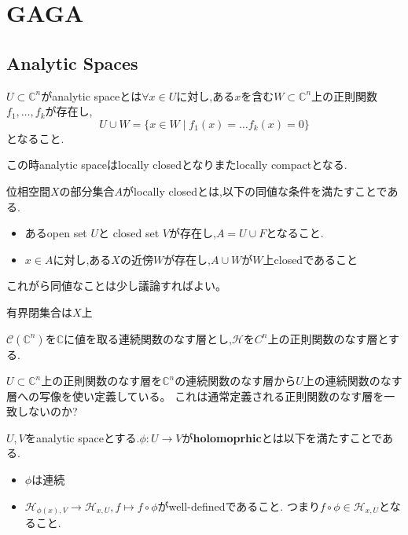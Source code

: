 \chapter{GAGA}
\section{Analytic Spaces}

\begin{screen}
\begin{dfn}
$U \subset \mathbb{C}^n$がanalytic spaceとは$\forall x \in U$に対し,ある$x$を含む$W \subset \mathbb{C}^n$上の正則関数$f_1, \ldots ,f_k$が存在し,
\begin{equation*}
  U \cup W = \{x \in W \mid f_1(x) = \ldots  f_k(x) = 0 \}
\end{equation*}
となること.
\end{dfn}
\end{screen}

この時analytic spaceはlocally closedとなりまたlocally compactとなる.
\begin{screen}
\begin{dfn}
位相空間$X$の部分集合$A$がlocally closedとは,以下の同値な条件を満たすことである.
\begin{itemize}
  \item あるopen set $U$と closed set $V$が存在し,$A = U \cup F$となること.
  \item $x \in A$に対し,ある$X$の近傍$W$が存在し,$A \cup W$が$W$上closedであること

\end{itemize}
\end{dfn}
\end{screen}

これがら同値なことは少し議論すればよい。

有界閉集合は$X$上

$\mathcal{C}(\mathbb{C}^n)$を$\mathbb{C}$に値を取る連続関数のなす層とし,$\mathcal{H}$を$C^n$上の正則関数のなす層とする.

\begin{rem}[疑問]
$U \subset \mathbb{C}^n$上の正則関数のなす層を$\mathbb{C}^n$の連続関数のなす層から$U$上の連続関数のなす層への写像を使い定義している。
これは通常定義される正則関数のなす層を一致しないのか?
\end{rem}

\begin{screen}
\begin{dfn}
 $U,V$をanalytic spaceとする.$\phi: U \to V$が\textbf{holomoprhic}とは以下を満たすことである.
 \begin{itemize}
   \item $\phi$は連続
   \item $\mathcal{H}_{\phi(x), V} \to \mathcal{H}_{x, U}, f \mapsto f \circ \phi$がwell-definedであること.
         つまり$f \circ \phi \in \mathcal{H}_{x, U}$となること.
 \end{itemize}
\end{dfn}
\end{screen}

